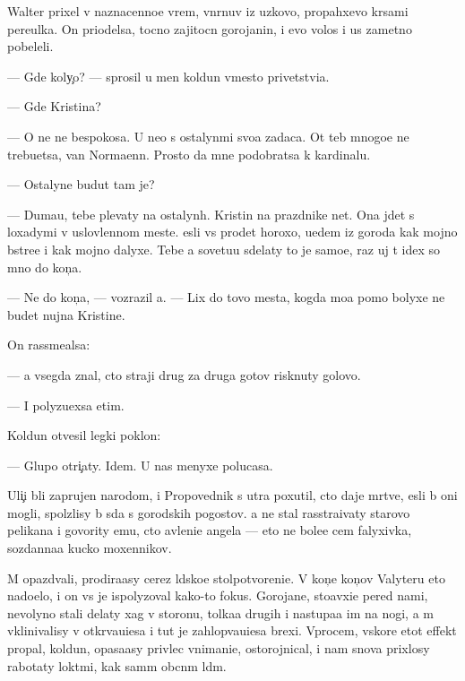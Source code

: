 \documentclass[10pt]{book}
\begin{document}
Walter prixel v naznacenno{\y}e vrem{\ia}, v{\yi}n{\yi}rnuv iz uzkovo, propahxevo kr{\yi}sami pereulka. On priodelsa, tocno zajitocn{\yi}{\y} gorojanin, i {\y}evo volos{\yi} i us{\yi} zametno pobeleli.

— Gde koly{\c}o? — sprosil u men{\ia} koldun vmesto privetstvi{\y}a.

— Gde Kristina?

— O ne{\y} ne bespoko{\y}sa. U ne{\y}o s ostalyn{\yi}mi svo{\y}a zadaca. Ot teb{\ia} mnogo{\y}e ne trebu{\y}etsa, van Normaenn. Prosto da{\y} mne podobratsa k kardinalu.

— Ostalyn{\yi}{\y}e budut tam je?

— Duma{\y}u, tebe plevaty na ostalyn{\yi}h. Kristin{\yi} na prazdnike net. Ona jdet s loxadymi v uslovlennom meste. {\Y}esli vs{\e} pro{\y}det horoxo, u{\y}edem iz goroda kak mojno b{\yi}stre{\y}e i kak mojno dalyxe. Tebe {\y}a sovetu{\y}u sdelaty to je samo{\y}e, raz uj t{\yi} idex so mno{\y} do kon{\c}a.

— Ne do kon{\c}a, — vozrazil {\y}a. — Lix do tovo mesta, kogda mo{\y}a pomo{\x} bolyxe ne budet nujna Kristine.

On rassme{\y}alsa:

— {\Y}a vsegda znal, cto straji drug za druga gotov{\yi} risknuty golovo{\y}.

— I polyzu{\y}exsa etim.

Koldun otvesil legki{\y} poklon:

— Glupo otri{\c}aty. Idem. U nas menyxe polucasa.

Uli{\c}i b{\yi}li zaprujen{\yi} narodom, i Propovednik s utra poxutil, cto daje m{\e}rtv{\yi}{\y}e, {\y}esli b{\yi} oni mogli, spolzlisy b{\yi} s{\iu}da s gorodskih pogostov. {\Y}a ne stal rasstra{\y}ivaty starovo pelikana i govority {\y}emu, cto {\y}avleni{\y}e angela — eto ne bole{\y}e cem falyxivka, sozdanna{\y}a kucko{\y} moxennikov.

M{\yi} opazd{\yi}vali, prodira{\y}asy cerez l{\iu}dsko{\y}e stolpotvoreni{\y}e. V kon{\c}e kon{\c}ov Valyteru eto nado{\y}elo, i on vs{\e} je ispolyzoval kako{\y}-to fokus. Gorojane, sto{\y}avxi{\y}e pered nami, nevolyno stali delaty xag v storonu, tolka{\y}a drugih i nastupa{\y}a im na nogi, a m{\yi} vklinivalisy v otkr{\yi}va{\y}u{\x}i{\y}esa i tut je zahlop{\yi}va{\y}u{\x}i{\y}esa brexi. Vprocem, vskore etot effekt propal, koldun, opasa{\y}asy privlec vnimani{\y}e, ostorojnical, i nam snova prixlosy rabotaty lokt{\ia}mi, kak sam{\yi}m ob{\yi}cn{\yi}m l{\iu}d{\ia}m.
\end{document}
